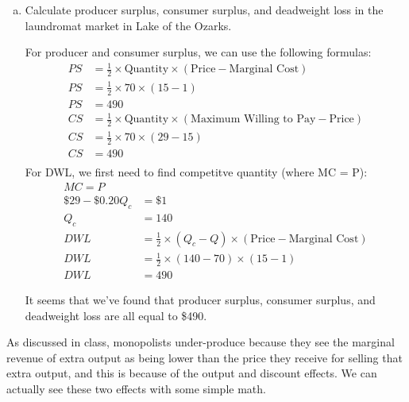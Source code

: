\documentclass{article}
\begin{document}
\begin{enumerate}[(a)]
    \item Calculate producer surplus, consumer surplus, and deadweight loss in the laundromat market in Lake of the Ozarks.
    
    For producer and consumer surplus, we can use the following formulas:
    \begin{align*}
        PS &= \frac{1}2 \times \text{Quantity} \times (\text{Price} - \text{Marginal Cost}) \\
        PS &= \frac{1}{2} \times 70 \times (15 - 1) \\
        PS &= 490 \\
        CS &= \frac{1}2 \times \text{Quantity} \times (\text{Maximum Willing to Pay} - \text{Price}) \\
        CS &= \frac{1}{2} \times 70 \times (29 - 15) \\
        CS &= 490 \\
    \end{align*}
    For DWL, we first need to find competitve quantity (where MC = P):
    \begin{align*}
        MC = P \\
        \$29 - \$0.20Q_c &= \$1 \\
        Q_c &= 140 \\
        DWL &= \frac{1}{2} \times (Q_c - Q) \times (\text{Price} - \text{Marginal Cost}) \\
        DWL &= \frac{1}{2} \times (140 - 70) \times (15 - 1) \\
        DWL &= 490
    \end{align*}

    It seems that we've found that producer surplus, consumer surplus, and deadweight loss are all equal to \$490.

\end{enumerate}

As discussed in class, monopolists under-produce because they see the
marginal revenue of extra output as being lower than the price they
receive for selling that extra output, and this is because of the output
and discount effects. We can actually see these two effects with some
simple math.
\end{document}
